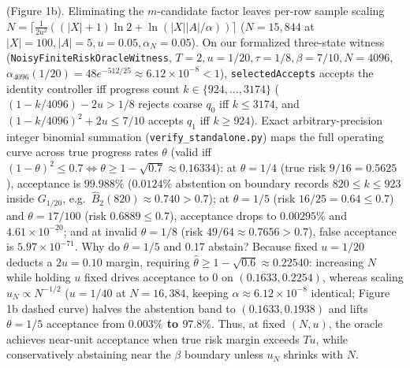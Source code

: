 \documentclass[11pt,a4paper]{article}
\begin{document}
\begin{enumerate}
{  (Figure 1b).} Eliminating the \(m\)-candidate factor leaves per-row
  sample scaling
  \(N = \lceil \frac{1}{2u^2}((|X|+1)\ln 2 + \ln(|X||A|/\alpha))\rceil\)
  (\(N = 15{,}844\) at \(|X|=100, |A|=5, u=0.05, \alpha_N=0.05\)). On
  our formalized three-state witness
  (\texttt{NoisyFiniteRiskOracleWitness},
  \(T=2, u=1/20, \tau=1/8, \beta=7/10, N=4096\),
  \(\alpha_{4096}(1/20) = 48 e^{-512/25} \approx 6.12 \times 10^{-8} < 1\)),
  \texttt{selectedAccepts} accepts the identity controller iff progress
  count \(k \in \{924, \dots, 3174\}\) (\((1 - k/4096) - 2u > 1/8\)
  rejects coarse \(q_0\) iff \(k \le 3174\), and
  \((1 - k/4096)^2 + 2u \le 7/10\) accepts \(q_1\) iff \(k \ge 924\)).
  Exact arbitrary-precision integer binomial summation
  (\texttt{verify\_standalone.py}) maps the full operating curve across
  true progress rates \(\theta\) (valid iff
  \((1-\theta)^2 \le 0.7 \iff \theta \ge 1 - \sqrt{0.7} \approx 0.16334\)):
  at \(\theta = 1/4\) (true risk \(9/16 = 0.5625\)), acceptance is
  \textbf{\(99.988\%\)} (\(0.0124\%\) abstention on boundary records
  \(820 \le k \le 923\) inside \(G_{1/20}\),
  e.g.~\(\widehat{B}_2(820) \approx 0.740 > 0.7\)); at \(\theta = 1/5\)
  (risk \(16/25 = 0.64 \le 0.7\)) and \(\theta = 17/100\) (risk
  \(0.6889 \le 0.7\)), acceptance drops to \textbf{\(0.00295\%\)} and
  \textbf{\(4.61 \times 10^{-20}\)}; and at invalid \(\theta = 1/8\)
  (risk \(49/64 \approx 0.7656 > 0.7\)), false acceptance is
  \textbf{\(5.97 \times 10^{-71}\)}. Why do \(\theta = 1/5\) and
  \(0.17\) abstain? Because fixed \(u = 1/20\) deducts a \(2u = 0.10\)
  margin, requiring
  \(\widehat{\theta} \ge 1 - \sqrt{0.6} \approx 0.22540\): increasing
  \(N\) while holding \(u\) fixed drives acceptance to \(0\) on
  \((0.1633, 0.2254)\), whereas scaling \(u_N \propto N^{-1/2}\)
  (\(u = 1/40\) at \(N = 16{,}384\), keeping
  \(\alpha \approx 6.12 \times 10^{-8}\) identical; Figure 1b dashed
  curve) halves the abstention band to \((0.1633, 0.1938)\) and lifts
  \(\theta = 1/5\) acceptance from \textbf{\(0.003\%\) to \(97.8\%\)}.
  Thus, at fixed \((N, u)\), the oracle achieves near-unit acceptance
  when true risk margin exceeds \(Tu\), while conservatively abstaining
  near the \(\beta\) boundary unless \(u_N\) shrinks with \(N\).
\end{enumerate}
\end{document}
